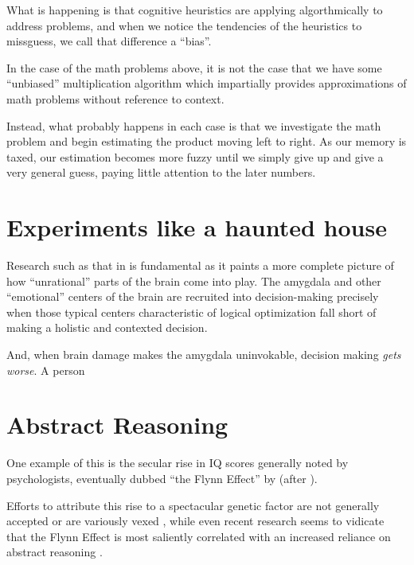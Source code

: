 \documentclass{article}
\begin{document}
What is happening is that cognitive heuristics are applying algorthmically to address problems, and when we notice the tendencies of the heuristics to missguess, we call that difference a ``bias''.

In the case of the math problems above, it is not the case that we have some ``unbiased'' multiplication algorithm which impartially provides approximations of math problems without reference to context.

Instead, what probably happens in each case is that we investigate the math problem and begin estimating the product moving left to right.
As our memory is taxed, our estimation becomes more fuzzy until we simply give up and give a very general guess, paying little attention to the later numbers.


\section{Experiments like a haunted house}

Research such as that in \textcite{hsu05} is fundamental as it paints a more complete picture of how ``unrational'' parts of the brain come into play.
The amygdala and other ``emotional'' centers of the brain are recruited into decision-making precisely when those typical centers characteristic of logical optimization fall short of making a holistic and contexted decision.

And, when brain damage makes the amygdala uninvokable, decision making \emph{gets worse}.
A person

\section{Abstract Reasoning}

One example of this is the secular rise in IQ scores generally noted by psychologists, eventually dubbed ``the Flynn Effect'' by \textcite{herrnstein94} (after \textcite{flynn87}).

Efforts to attribute this rise to a spectacular genetic factor are not generally accepted or are variously vexed \parencite{woodley11}, while even recent research seems to vidicate that the Flynn Effect is most saliently correlated with an increased reliance on abstract reasoning \parencite{must16}.

\printbibliography
\end{document}
